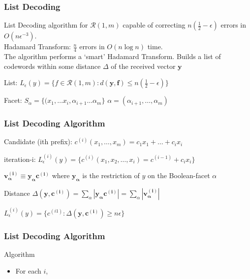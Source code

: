\documentclass[xcolor=xvgnames]{beamer}
\newcommand{\RM}[2]{\ensuremath{\mathcal{R}(#1,#2)}}
\newcommand{\V}[1]{\ensuremath{\mathbf{#1}}}
\begin{document}

\begin{frame}
\frametitle{List Decoding}

List Decoding algorithm for $\RM{1}{m}$ capable of correcting $n(\frac{1}{2} - \epsilon)$ errors in $O(n \epsilon^{-3})$. \\
Hadamard Transform: $\frac{n}{4}$ errors in $O(n\log{n})$ time. \\

The algorithm performs a `smart' Hadamard Transform.
Builds a list of codewords within some distance $\Delta$ of the
received vector $\V{y}$

\alert{List:} $L_{\epsilon}(y) = \{f \in \RM{1}{m} : d(\V{y}, \V{f} ) \leq n(\frac{1}{2} - \epsilon) \} $ 

\alert{Facet:} $S_\alpha = \{(x_1,\ldots x_i, \alpha_{i+1}\ldots \alpha_{m} \}$ \quad $ \alpha=(\alpha_{i+1}, \ldots ,\alpha_m)$ 

 \end{frame}

 

\begin{frame}
  \frametitle{List Decoding Algorithm}

\alert{Candidate (ith prefix)}: $c^{(i)} (x_1 ,\ldots, x_m) = c_1x_1 + \ldots + c_ix_i$ 

\alert{iteration-i: } $ L_{\epsilon}^{(i)} (y) = \{c^{(i)}(x_1,x_2,\ldots,x_i) = c^{(i-1)}+c_ix_i\}$ 

$\V{v_\alpha^{(i)}} \equiv \V{y_\alpha}\V{c^{(i)}}$ where
$\V{y_\alpha}$ is the restriction of $y$ on the Boolean-facet $\alpha$

\begin{block}{Distance}
 $\Delta(\V{y},\V{c^{(i)}}) = \sum_\alpha|\V{y_\alpha}\V{c^{(i)}}| = \sum_\alpha|\V{v_\alpha^{(i)}}|$
\end{block}

\begin{block}
$ L_{\epsilon}^{(i)} (y) = \{c^{(i1)} : \Delta(\V{y},\V{c^{(i)}}) \geq n\epsilon \} $
\end{block}

\end{frame}


\begin{frame}
 \frametitle{List Decoding Algorithm}
\begin{block}{Algorithm}
 \begin{itemize}
 \item For each $i$, 
\end{itemize}

\end{block}

\end{frame}
\end{document}
